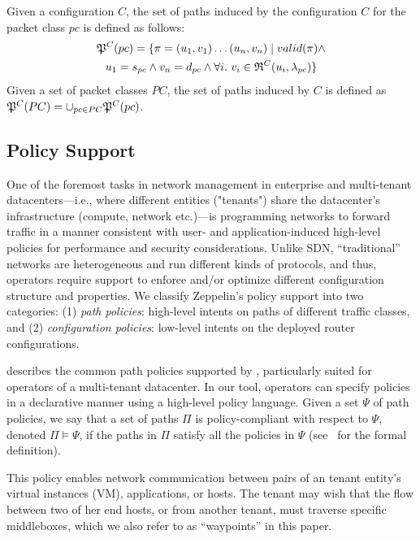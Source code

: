 \begin{definition} \label{def:inducedpaths}
Given a configuration $C$, the set of paths induced
by the configuration $C$ for the packet class $pc$ is defined as follows:
\begin{multline*}
\mathfrak{P}^C(pc) = \{\pi=(u_1, v_1)\ldots (u_n, v_n) \mid 
valid(\pi) \wedge \\
u_1 = s_{pc} \wedge v_n= d_{pc} \wedge
\forall i. ~v_i \in \mathfrak{R}^C(u_i,\lambda_{pc})\}
\end{multline*}
Given a set of packet classes $PC$, the set of paths
 induced by $C$ is defined as
$\mathfrak{P}^C(PC) = \cup_{pc\in PC} \mathfrak{P}^C(pc)$.
\end{definition}

\subsection{Policy Support} \label{sec:policy}

One of the foremost tasks in network management in enterprise 
and multi-tenant datacenters---i.e., where different entities ("tenants") share the datacenter's 
infrastructure (compute, network etc.)---is programming 
networks to forward traffic in a manner consistent with user- and
application-induced high-level policies for performance and security considerations. 
Unlike SDN, ``traditional'' networks are  heterogeneous and run different kinds of 
protocols, and thus, operators require
 support to enforce and/or optimize different
configuration  structure and properties. We 
classify Zeppelin's policy support  into two categories: 
(1) \emph{path policies}: high-level intents on paths of different traffic classes, and 
(2) \emph{configuration policies}: low-level intents on the deployed router configurations. 

  
 describes 
the common path policies 
supported by \name, particularly suited for operators 
of a multi-tenant datacenter. 
In our tool, operators can
specify policies in a declarative manner using a high-level 
policy language. 
Given  a set $\Psi$ of
path policies, we say that
a set of paths $\Pi$ is policy-compliant with respect to $\Psi$, 
denoted  $\Pi \models \Psi$,
if the paths in $\Pi$ satisfy all the policies in $\Psi$ (see~\cite{genesis} for the formal definition). 


This policy enables network communication
between pairs of an tenant entity's virtual instances (VM), 
applications, or hosts.  
The tenant may wish that the flow
between two of her end hosts, or from another tenant, must traverse
specific middleboxes, which we also refer to as ``waypoints'' in
this paper.    

